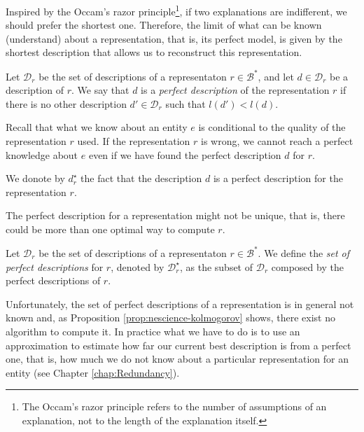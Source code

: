 Inspired by the Occam's razor principle\footnote{The Occam's razor principle refers to the number of assumptions of an explanation, not to the length of the explanation itself.}, if two explanations are indifferent, we should prefer the shortest one. Therefore, the limit of what can be known (understand) about a representation, that is, its perfect model, is given by the shortest description that allows us to reconstruct this representation.

\begin{definition}
\label{def:descriptions_perfect_model}
Let $\mathcal{D}_r$ be the set of descriptions of a representaton $r \in \mathcal{B}^\ast$, and let $d \in \mathcal{D}_r$ be a description of $r$. We say that $d$ is a \emph{perfect description} of the representation $r$ if there is no other description $d' \in\mathcal{D}_r$ such that $l(d') < l(d)$.
\end{definition}

Recall that what we know about an entity $e$ is conditional to the quality of the representation $r$ used. If the representation $r$ is wrong, we cannot reach a perfect knowledge about $e$ even if we have found the perfect description $d$ for $r$.

\begin{notation}
We donote by $d_r^{\star}$ the fact that the description $d$ is a perfect description for the representation $r$.
\end{notation}

The perfect description for a representation might not be unique, that is, there could be more than one optimal way to compute $r$.

\begin{definition}
\label{def:set_descriptions_perfect_model}
Let $\mathcal{D}_r$ be the set of descriptions of a representaton $r \in \mathcal{B}^\ast$. We define the \emph{set of perfect descriptions} for $r$, denoted by $\mathcal{D}^\star_r$, as the subset of $\mathcal{D}_r$ composed by the perfect descriptions of $r$.
\end{definition}

Unfortunately, the set of perfect descriptions of a representation is in general not known and, as Proposition \ref{prop:nescience-kolmogorov} shows, there exist no algorithm to compute it. In practice what we have to do is to use an approximation to estimate how far our current best description is from a perfect one, that is, how much we do not know about a particular representation for an entity (see Chapter \ref{chap:Redundancy}).

